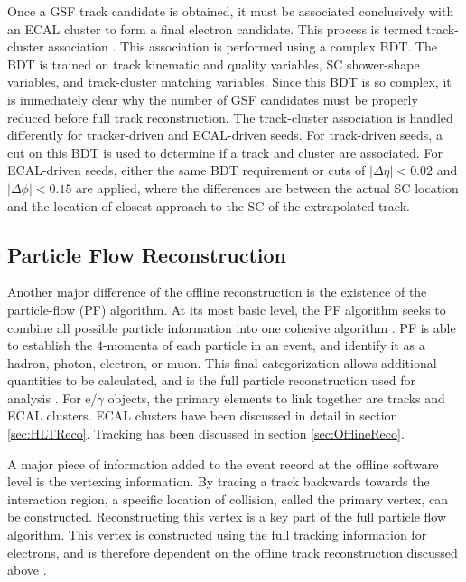\documentclass[12pt]{ucsddissertation}
\begin{document}
Once a GSF track candidate is obtained, it must be associated conclusively with an ECAL cluster to form a final electron candidate. This process is termed track-cluster association \cite{OfflineReco2021}. This association is performed using a complex BDT. The BDT is trained on track kinematic and quality variables, SC shower-shape variables, and track-cluster matching variables. Since this BDT is so complex, it is immediately clear why the number of GSF candidates must be properly reduced before full track reconstruction. The track-cluster association is handled differently for tracker-driven and ECAL-driven seeds. For track-driven seeds, a cut on this BDT is used to determine if a track and cluster are associated. For ECAL-driven seeds, either the same BDT requirement or cuts of $\lvert \Delta \eta \rvert < 0.02$ and $\lvert \Delta \phi \rvert < 0.15$ are applied, where the differences are between the actual SC location and the location of closest approach to the SC of the extrapolated track. 

\subsection{Particle Flow Reconstruction}\label{sec:ParticleFlow}
Another major difference of the offline reconstruction is the existence of the particle-flow (PF) algorithm. At its most basic level, the PF algorithm seeks to combine all possible particle information into one cohesive algorithm \cite{ParticleFlow}. PF is able to establish the 4-momenta of each particle in an event, and identify it as a hadron, photon, electron, or muon. This final categorization allows additional quantities to be calculated, and is the full particle reconstruction used for analysis \cite{OfflineReco2021}. For e/$\gamma$ objects, the primary elements to link together are tracks and ECAL clusters. ECAL clusters have been discussed in detail in section \ref{sec:HLTReco}. Tracking has been discussed in section \ref{sec:OfflineReco}. 

A major piece of information added to the event record at the offline software level is the vertexing information. By tracing a track backwards towards the interaction region, a specific location of collision, called the primary vertex, can be constructed. Reconstructing this vertex is a key part of the full particle flow algorithm. This vertex is constructed using the full tracking information for electrons, and is therefore dependent on the offline track reconstruction discussed above \cite{PhotonReco2015}. 
\end{document}
